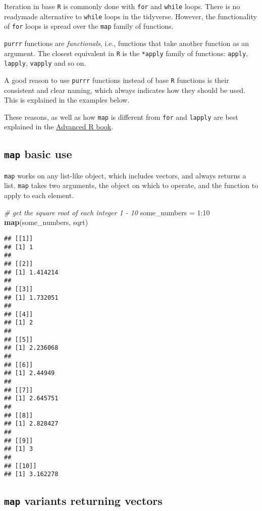 \documentclass[
]{book}
\newenvironment{Shaded}{}{}
\newcommand{\CommentTok}[1]{\textcolor[rgb]{0.38,0.63,0.69}{\textit{#1}}}
\newcommand{\DecValTok}[1]{\textcolor[rgb]{0.25,0.63,0.44}{#1}}
\newcommand{\KeywordTok}[1]{\textcolor[rgb]{0.00,0.44,0.13}{\textbf{#1}}}
\newcommand{\NormalTok}[1]{#1}
\newcommand{\OperatorTok}[1]{\textcolor[rgb]{0.40,0.40,0.40}{#1}}
\newcommand{\StringTok}[1]{\textcolor[rgb]{0.25,0.44,0.63}{#1}}
\begin{document}
Iteration in base \texttt{R} is commonly done with \texttt{for} and \texttt{while} loops.
There is no readymade alternative to \texttt{while} loops in the tidyverse.
However, the functionality of \texttt{for} loops is spread over the \texttt{map} family of functions.

\texttt{purrr} functions are \emph{functionals}, i.e., functions that take another function as an argument.
The closest equivalent in \texttt{R} is the \texttt{*apply} family of functions: \texttt{apply}, \texttt{lapply}, \texttt{vapply} and so on.

A good reason to use \texttt{purrr} functions instead of base \texttt{R} functions is their consistent and clear naming, which always indicates how they should be used.
This is explained in the examples below.

These reasons, as well as how \texttt{map} is different from \texttt{for} and \texttt{lapply} are best explained in the \href{https://adv-r.hadley.nz/functionals.html}{Advanced R book}.

\hypertarget{map-basic-use}{%
\subsection{\texorpdfstring{\texttt{map} basic use}{map basic use}}\label{map-basic-use}}

\texttt{map} works on any list-like object, which includes vectors, and always returns a list. \texttt{map} takes two arguments, the object on which to operate, and the function to apply to each element.

\begin{Shaded}
\begin{Highlighting}[]
\CommentTok{# get the square root of each integer 1 - 10}
\NormalTok{some_numbers =}\StringTok{ }\DecValTok{1}\OperatorTok{:}\DecValTok{10}
\KeywordTok{map}\NormalTok{(some_numbers, sqrt)}
\end{Highlighting}
\end{Shaded}

\begin{verbatim}
## [[1]]
## [1] 1
## 
## [[2]]
## [1] 1.414214
## 
## [[3]]
## [1] 1.732051
## 
## [[4]]
## [1] 2
## 
## [[5]]
## [1] 2.236068
## 
## [[6]]
## [1] 2.44949
## 
## [[7]]
## [1] 2.645751
## 
## [[8]]
## [1] 2.828427
## 
## [[9]]
## [1] 3
## 
## [[10]]
## [1] 3.162278
\end{verbatim}

\hypertarget{map-variants-returning-vectors}{%
\subsection{\texorpdfstring{\texttt{map} variants returning vectors}{map variants returning vectors}}\label{map-variants-returning-vectors}}
\end{document}
